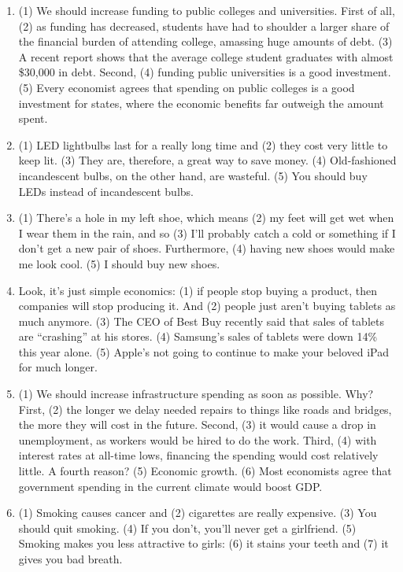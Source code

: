 \begin{enumerate}
\item (1) We should increase funding to public colleges and universities. First of all, (2) as funding
has decreased, students have had to shoulder a larger share of the financial burden of attending
college, amassing huge amounts of debt. (3) A recent report shows that the average college student
graduates with almost \$30,000 in debt. Second, (4) funding public universities is a good
investment. (5) Every economist agrees that spending on public colleges is a good investment for
states, where the economic benefits far outweigh the amount spent.

\item (1) LED lightbulbs last for a really long time and (2) they cost very little to keep lit. (3) They
are, therefore, a great way to save money. (4) Old-fashioned incandescent bulbs, on the other hand,
are wasteful. (5) You should buy LEDs instead of incandescent bulbs.

\item (1) There's a hole in my left shoe, which means (2) my feet will get wet when I wear them in
the rain, and so (3) I'll probably catch a cold or something if I don't get a new pair of shoes.
Furthermore, (4) having new shoes would make me look cool. (5) I should buy new shoes.

\item Look, it's just simple economics: (1) if people stop buying a product, then companies will stop
producing it. And (2) people just aren't buying tablets as much anymore. (3) The CEO of Best Buy
recently said that sales of tablets are ``crashing'' at his stores. (4) Samsung's sales of tablets were
down 14\% 
this year alone. (5) Apple's not going to continue to make your beloved iPad for much
longer.

\item (1) We should increase infrastructure spending as soon as possible. Why? First, (2) the longer
we delay needed repairs to things like roads and bridges, the more they will cost in the future.
Second, (3) it would cause a drop in unemployment, as workers would be hired to do the work.
Third, (4) with interest rates at all-time lows, financing the spending would cost relatively little. A
fourth reason? (5) Economic growth. (6) Most economists agree that government spending in the
current climate would boost GDP.

\item  (1) Smoking causes cancer and (2) cigarettes are really expensive. (3) You should quit smoking.
(4) If you don't, you'll never get a girlfriend. (5) Smoking makes you less attractive to girls: (6) it
stains your teeth and (7) it gives you bad breath.
\end{enumerate}
